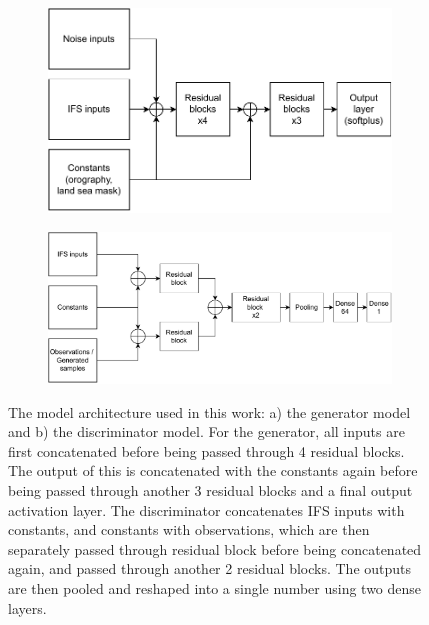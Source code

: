 \documentclass[../main.tex]{subfiles}
\begin{document}
     
\begin{figure}[h]
     \begin{subfigure}[c]{0.48\textwidth}
     \centering
         \includegraphics[width=\textwidth]{images/generator_2.drawio.pdf}
         \caption{}
         \centering
     \end{subfigure}
     \hfill
     \begin{subfigure}[c]{0.48\textwidth}
         \includegraphics[width=\textwidth]{images/discriminator.drawio.pdf}
         \caption{}
         \centering
     \end{subfigure}
      \caption{The model architecture used in this work: a) the generator model and b) the discriminator model. For the generator, all inputs are first concatenated before being passed through 4 residual blocks. The output of this is concatenated with the constants again before being passed through another 3 residual blocks and a final output activation layer. The discriminator concatenates IFS inputs with constants, and constants with observations, which are then separately passed through residual block before being concatenated again, and passed through another 2 residual blocks. The outputs are then pooled and reshaped into a single number using two dense layers.}
     \label{fig:resnet}
\end{figure}    
\end{document}

